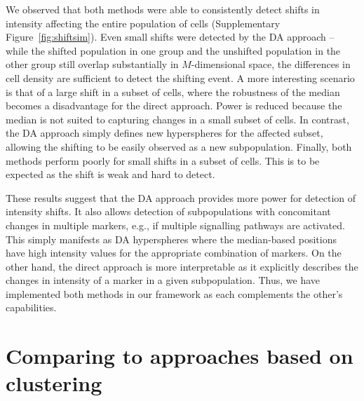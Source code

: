 \documentclass{article}
\begin{document}
We observed that both methods were able to consistently detect shifts in intensity affecting the entire population of cells (Supplementary Figure~\ref{fig:shiftsim}).
Even small shifts were detected by the DA approach -- while the shifted population in one group and the unshifted population in the other group still overlap substantially in $M$-dimensional space, the differences in cell density are sufficient to detect the shifting event.
A more interesting scenario is that of a large shift in a subset of cells, where the robustness of the median becomes a disadvantage for the direct approach.
Power is reduced because the median is not suited to capturing changes in a small subset of cells.
In contrast, the DA approach simply defines new hyperspheres for the affected subset, allowing the shifting to be easily observed as a new subpopulation.
Finally, both methods perform poorly for small shifts in a subset of cells.
This is to be expected as the shift is weak and hard to detect.

These results suggest that the DA approach provides more power for detection of intensity shifts.
It also allows detection of subpopulations with concomitant changes in multiple markers, e.g., if multiple signalling pathways are activated.
This simply manifests as DA hyperspheres where the median-based positions have high intensity values for the appropriate combination of markers.
On the other hand, the direct approach is more interpretable as it explicitly describes the changes in intensity of a marker in a given subpopulation.
Thus, we have implemented both methods in our framework as each complements the other's capabilities.

\section{Comparing to approaches based on clustering}
\end{document}
